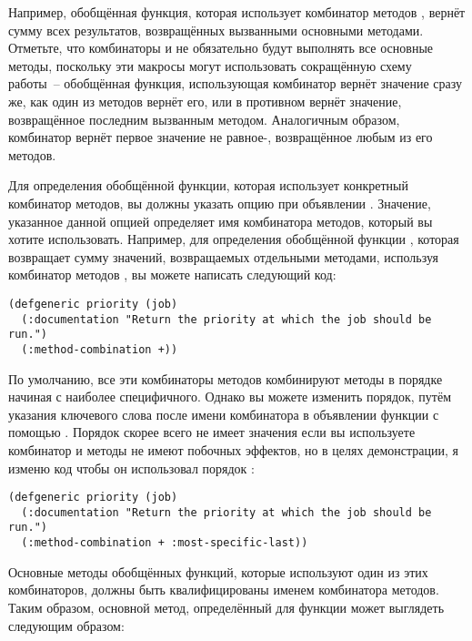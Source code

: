 Например, обобщённая функция, которая использует комбинатор методов \code{+}, вернёт сумму
всех результатов, возвращённых вызванными основными методами.  Отметьте, что комбинаторы
 и  не обязательно будут выполнять все основные методы, поскольку эти
макросы могут использовать сокращённую схему работы~-- обобщённая функция, использующая
комбинатор  вернёт значение  сразу же, как один из методов вернёт его,
или в противном вернёт значение, возвращённое последним вызванным методом.  Аналогичным
образом, комбинатор  вернёт первое значение не равное-, возвращённое
любым из его методов.

Для определения обобщённой функции, которая использует конкретный комбинатор методов, вы
должны указать опцию  при объявлении .
Значение, указанное данной опцией определяет имя комбинатора методов, который вы хотите
использовать.  Например, для определения обобщённой функции , которая
возвращает сумму значений, возвращаемых отдельными методами, используя комбинатор методов
\code{+}, вы можете написать следующий код:

\begin{lstlisting}
(defgeneric priority (job)
  (:documentation "Return the priority at which the job should be run.")
  (:method-combination +))
\end{lstlisting}

По умолчанию, все эти комбинаторы методов комбинируют методы в порядке начиная с наиболее
специфичного.  Однако вы можете изменить порядок, путём указания ключевого слова
 после имени комбинатора в объявлении функции с помощью
.  Порядок скорее всего не имеет значения если вы используете комбинатор
\code{+} и методы не имеют побочных эффектов, но в целях демонстрации, я изменю код
 чтобы он использовал порядок :

\begin{lstlisting}
(defgeneric priority (job)
  (:documentation "Return the priority at which the job should be run.")
  (:method-combination + :most-specific-last))
\end{lstlisting}

Основные методы обобщённых функций, которые используют один из этих комбинаторов, должны
быть квалифицированы именем комбинатора методов.  Таким образом, основной метод,
определённый для функции  может выглядеть следующим образом:

